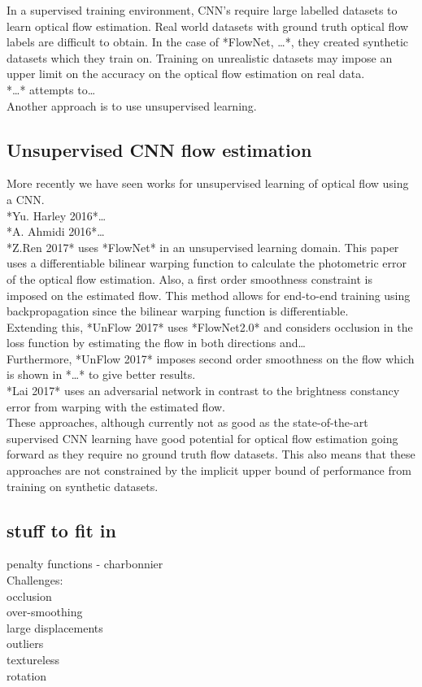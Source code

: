 In a supervised training environment, CNN’s require large labelled datasets to learn optical flow estimation. Real world datasets with ground truth optical flow labels are difficult to obtain. In the case of *FlowNet, …*, they created synthetic datasets which they train on. Training on unrealistic datasets may impose an upper limit on the accuracy on the optical flow estimation on real data. \\
*…* attempts to… \\
Another approach is to use unsupervised learning.\\

\subsection{Unsupervised CNN flow estimation}
More recently we have seen works for unsupervised learning of optical flow using a CNN. \\
*Yu. Harley 2016*… \\
*A. Ahmidi 2016*… \\
*Z.Ren 2017* uses *FlowNet* in an unsupervised learning domain. This paper uses a differentiable bilinear warping function to calculate the photometric error of the optical flow estimation. Also, a first order smoothness constraint is imposed on the estimated flow. This method allows for end-to-end training using backpropagation since the bilinear warping function is differentiable.\\
Extending this, *UnFlow 2017* uses *FlowNet2.0* and considers occlusion in the loss function by estimating the flow in both directions and…\\
Furthermore, *UnFlow 2017* imposes second order smoothness on the flow which is shown in *…* to give better results.\\
*Lai 2017* uses an adversarial network in contrast to the brightness constancy error from warping with the estimated flow.\\
These approaches, although currently not as good as the state-of-the-art supervised CNN learning have good potential for optical flow estimation going forward as they require no ground truth flow datasets. This also means that these approaches are not constrained by the implicit upper bound of performance from training on synthetic datasets.\\

\subsection{stuff to fit in}
penalty functions - charbonnier\\
Challenges:\\
occlusion\\
over-smoothing\\
large displacements\\
outliers\\
textureless\\
rotation